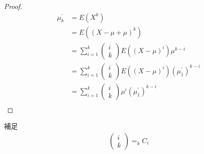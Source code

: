 \documentclass[dvipdfmx,10pt, a4j]{jarticle}
\theoremstyle{definition}
\begin{document}
\begin{proof}
    \begin{align*}
        \mu_k^{\prime} & = E(X^k)              \\
                       & =E((X - \mu + \mu)^k) \\
                       & =\sum_{i=1}^{k}
        \left(
        \begin{array}{c}
                i \\
                k
            \end{array}
        \right)
        E((X-\mu)^i)\mu^{k-i}                  \\
                       & =\sum_{i=1}^{k}
        \left(
        \begin{array}{c}
                i \\
                k
            \end{array}
        \right)
        E((X-\mu)^i)(\mu_1^{\prime})^{k-i}     \\
                       & =\sum_{i=1}^{k}
        \left(
        \begin{array}{c}
                i \\
                k
            \end{array}
        \right)
        \mu^{i}(\mu_1^{\prime})^{k-i}          \\
    \end{align*}
\end{proof}
\begin{itembox}[l]{補足}
    \begin{align*}
        \left(
        \begin{array}{c}
                i \\
                k
            \end{array}
        \right) = ^{}_kC_i \\
    \end{align*}
\end{itembox}\\
\end{document}
